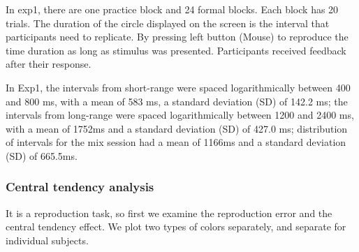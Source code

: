 \documentclass[
]{article}
\begin{document}
In exp1, there are one practice block and 24 formal blocks. Each block
has 20 trials. The duration of the circle displayed on the screen is the
interval that participants need to replicate. By pressing left button
(Mouse) to reproduce the time duration as long as stimulus was
presented. Participants received feedback after their response.

In Exp1, the intervals from short-range were spaced logarithmically
between 400 and 800 ms, with a mean of 583 ms, a standard deviation (SD)
of 142.2 ms; the intervals from long-range were spaced logarithmically
between 1200 and 2400 ms, with a mean of 1752ms and a standard deviation
(SD) of 427.0 ms; distribution of intervals for the mix session had a
mean of 1166ms and a standard deviation (SD) of 665.5ms.

\hypertarget{central-tendency-analysis}{%
\subsubsection{Central tendency
analysis}\label{central-tendency-analysis}}

It is a reproduction task, so first we examine the reproduction error
and the central tendency effect. We plot two types of colors separately,
and separate for individual subjects.
\end{document}
